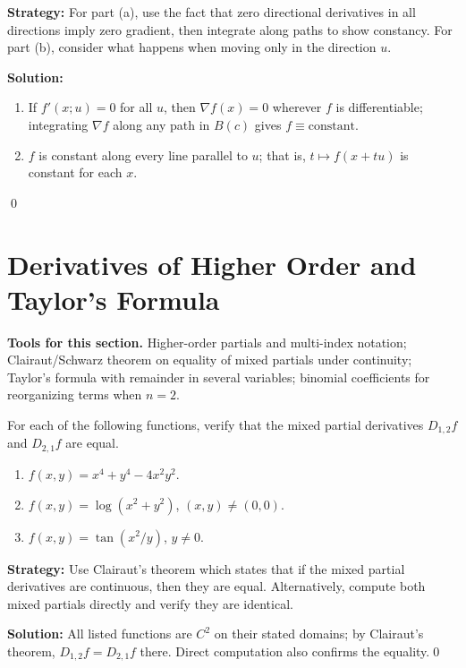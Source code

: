 \noindent\textbf{Strategy:} For part (a), use the fact that zero directional derivatives in all directions imply zero gradient, then integrate along paths to show constancy. For part (b), consider what happens when moving only in the direction \( u \).

\bigskip\noindent\textbf{Solution:}
\begin{enumerate}[label=(\alph*)]
\item If $f'(x;u)=0$ for all $u$, then $\nabla f(x)=0$ wherever $f$ is differentiable; integrating $\nabla f$ along any path in $B(c)$ gives $f\equiv\text{constant}$.
\item $f$ is constant along every line parallel to $u$; that is, $t\mapsto f(x+tu)$ is constant for each $x$.
\end{enumerate}\qed
\section{Derivatives of Higher Order and Taylor's Formula}

\noindent\textbf{Tools for this section.} Higher-order partials and multi-index notation; Clairaut/Schwarz theorem on equality of mixed partials under continuity; Taylor's formula with remainder in several variables; binomial coefficients for reorganizing terms when $n=2$.



\begin{problembox}
For each of the following functions, verify that the mixed partial derivatives \( D_{1,2}f \) and \( D_{2,1}f \) are equal.
\begin{enumerate}[label=(\alph*)]
\item \( f(x, y) = x^4 + y^4 - 4x^2y^2 \).
\item \( f(x, y) = \log (x^2 + y^2) \), \( (x, y) \neq (0, 0) \).
\item \( f(x, y) = \tan (x^2/y) \), \( y \neq 0 \).
\end{enumerate}
\end{problembox}

\noindent\textbf{Strategy:} Use Clairaut's theorem which states that if the mixed partial derivatives are continuous, then they are equal. Alternatively, compute both mixed partials directly and verify they are identical.

\bigskip\noindent\textbf{Solution:}
All listed functions are $C^2$ on their stated domains; by Clairaut's theorem, $D_{1,2}f=D_{2,1}f$ there. Direct computation also confirms the equality.\qed


